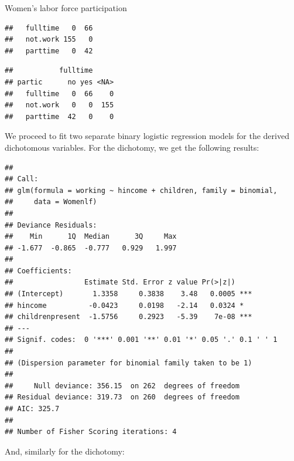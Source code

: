 \documentclass[11pt]{book}
\renewenvironment{knitrout}{\small\renewcommand{\baselinestretch}{.85}}{} %
\begin{document}
\begin{Example}[wlfpart1]{Women's labor force participation}
\begin{knitrout}
\begin{kframe}
\begin{verbatim}
##   fulltime   0  66
##   not.work 155   0
##   parttime   0  42
\end{verbatim}
\begin{alltt}
  \hlstd{=}\hlstd{))}
\end{alltt}
\begin{verbatim}
##           fulltime
## partic      no yes <NA>
##   fulltime   0  66    0
##   not.work   0   0  155
##   parttime  42   0    0
\end{verbatim}
\end{kframe}
\end{knitrout}

We proceed to fit two separate binary logistic regression models
for the derived dichotomous variables.
For the  dichotomy, we get the following results:
\begin{knitrout}
\color{fgcolor}\begin{kframe}
\begin{alltt}
 \hlkwb{<-}  \hlopt{~}  \hlopt{+}  
\end{alltt}
\begin{verbatim}
## 
## Call:
## glm(formula = working ~ hincome + children, family = binomial, 
##     data = Womenlf)
## 
## Deviance Residuals: 
##    Min      1Q  Median      3Q     Max  
## -1.677  -0.865  -0.777   0.929   1.997  
## 
## Coefficients:
##                 Estimate Std. Error z value Pr(>|z|)    
## (Intercept)       1.3358     0.3838    3.48   0.0005 ***
## hincome          -0.0423     0.0198   -2.14   0.0324 *  
## childrenpresent  -1.5756     0.2923   -5.39    7e-08 ***
## ---
## Signif. codes:  0 '***' 0.001 '**' 0.01 '*' 0.05 '.' 0.1 ' ' 1
## 
## (Dispersion parameter for binomial family taken to be 1)
## 
##     Null deviance: 356.15  on 262  degrees of freedom
## Residual deviance: 319.73  on 260  degrees of freedom
## AIC: 325.7
## 
## Number of Fisher Scoring iterations: 4
\end{verbatim}
\end{kframe}
\end{knitrout}
And, similarly for the  dichotomy:
\begin{knitrout}
\color{fgcolor}\begin{kframe}

\end{kframe}
\end{knitrout}
\end{Example}
\end{document}
